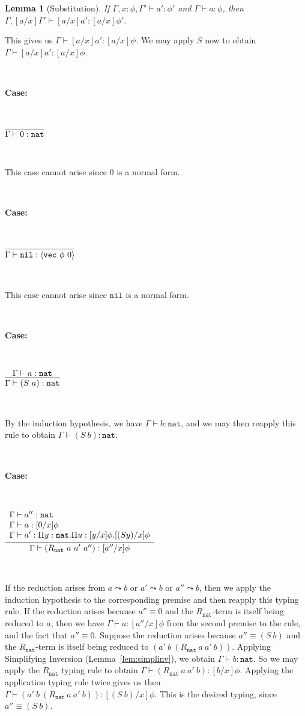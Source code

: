 \documentclass[copyright]{eptcs}
\newtheorem{lemma}{Lemma}
\newcommand{\vc}[0]{\texttt{vec}}
\newcommand{\nat}[0]{\texttt{nat}}
\newcommand{\nil}[0]{\texttt{nil}}
\begin{document}
\begin{lemma}[Substitution]
\label{lem:subst}
If $\Gamma,x:\phi,\Gamma'\vdash a':\phi'$ and $\Gamma\vdash a:\phi$,
then $\Gamma,[a/x]\Gamma'\vdash [a/x]a':[a/x]\phi'$.
\end{lemma}

\noindent This gives us $\Gamma\vdash[a/x]a':[a/x]\psi$.  We may
apply $S$ now to obtain $\Gamma\vdash[a/x]a':[a/x]\phi$. 

\ 

\noindent \textbf{Case:}

\

$\infer{\Gamma\vdash 0:\nat}{\ }$

\

\noindent This case cannot arise since $0$ is a normal form.

\ 

\noindent \textbf{Case:}

\

$\infer{\Gamma\vdash \nil:\langle\vc\ \phi\ 0\rangle}{\ }$

\ 

\noindent This case cannot arise since $\nil$ is a normal form.

\ 

\noindent \textbf{Case:}

\

$\infer{\Gamma\vdash (S\ a):\nat}{\Gamma\vdash a:\nat  }$

\ 

\noindent By the induction hypothesis, we have $\Gamma\vdash b:\nat$,
and we may then reapply this rule to obtain $\Gamma\vdash
(S\ b):\nat$.

\ 

\noindent \textbf{Case:}

\

$\infer{\Gamma\vdash (R_\nat\ a\ a'\ a''):[a''/x]\phi}
      {\begin{array}{l}\Gamma \vdash a'' : \nat \\
       \Gamma \vdash a : [0/x]\phi \\
       \Gamma \vdash a' : \Pi y:\nat. \Pi u : [y/x]\phi. [(S y)/x]\phi
       \end{array}}$

\ 

\noindent If the reduction arises from $a\leadsto b$ or $a'\leadsto b$
or $a''\leadsto b$, then we apply the induction hypothesis to the
corresponding premise and then reapply this typing rule.  If the
reduction arises because $a''\equiv 0$ and the $R_\nat$-term is itself
being reduced to $a$, then we have $\Gamma\vdash a:[a''/x]\phi$ from
the second premise to the rule, and the fact that $a''\equiv
0$. Suppose the reduction arises because $a''\equiv (S\ b)$ and the
$R_\nat$-term is itself being reduced to
$(a'\ b\ (R_\nat\ a\ a'\ b))$.  Applying Simplifying Inversion
(Lemma~\ref{lem:simplinv}), we obtain $\Gamma\vdash b:\nat$.  
So we may apply the $R_\nat$ typing rule
to obtain $\Gamma\vdash(R_\nat\ a\ a'\ b):[b/x]\phi$.  Applying the
application typing rule twice gives us then
$\Gamma\vdash(a'\ b\ (R_\nat\ a\ a'\ b)):[(S\ b)/x]\phi$. This is the
desired typing, since $a''\equiv (S\ b)$.
\end{document}
